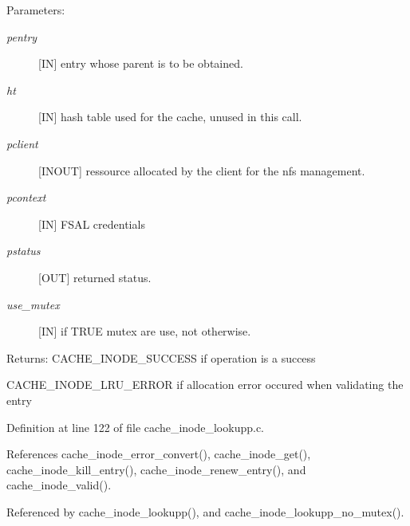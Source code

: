\begin{Desc}
\item[Parameters:]
\begin{description}
\item[{\em pentry}][IN] entry whose parent is to be obtained. \item[{\em ht}][IN] hash table used for the cache, unused in this call. \item[{\em pclient}][INOUT] ressource allocated by the client for the nfs management. \item[{\em pcontext}][IN] FSAL credentials \item[{\em pstatus}][OUT] returned status. \item[{\em use\_\-mutex}][IN] if TRUE mutex are use, not otherwise.\end{description}
\end{Desc}
\begin{Desc}
\item[Returns:]CACHE\_\-INODE\_\-SUCCESS if operation is a success \par
 

CACHE\_\-INODE\_\-LRU\_\-ERROR if allocation error occured when validating the entry \end{Desc}


Definition at line 122 of file cache\_\-inode\_\-lookupp.c.

References cache\_\-inode\_\-error\_\-convert(), cache\_\-inode\_\-get(), cache\_\-inode\_\-kill\_\-entry(), cache\_\-inode\_\-renew\_\-entry(), and cache\_\-inode\_\-valid().

Referenced by cache\_\-inode\_\-lookupp(), and cache\_\-inode\_\-lookupp\_\-no\_\-mutex().